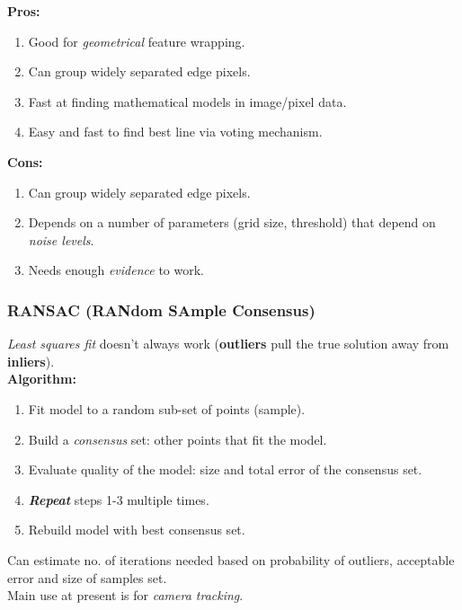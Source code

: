 \documentclass[english, 10pt]{article}
\begin{document}
  \textbf{Pros:}

  \begin{enumerate}
  \item
    Good for \emph{geometrical} feature wrapping.
  \item
    Can group widely separated edge pixels.
  \item
    Fast at finding mathematical models in image/pixel data.
  \item
    Easy and fast to find best line via voting mechanism.
  \end{enumerate}


  \textbf{Cons:}

  \begin{enumerate}
  \item
    Can group widely separated edge pixels.
  \item
    Depends on a number of parameters (grid size, threshold) that depend
    on \emph{noise levels}.
  \item
    Needs enough \emph{evidence} to work.
  \end{enumerate}

\subsubsection{RANSAC (RANdom SAmple
Consensus)}

  \textit{Least squares fit} doesn't always work (\textbf{outliers} pull the
  true solution away from \textbf{inliers}). \\
  
  \textbf{Algorithm:}

  \begin{enumerate}
  \item
    Fit model to a random sub-set of points (sample).
  \item
    Build a \emph{consensus} set: other points that fit the model.
  \item
    Evaluate quality of the model: size and total error of the consensus
    set.
  \item
    \textbf{\emph{Repeat}} steps 1-3 multiple times.
  \item
    Rebuild model with best consensus set.
  \end{enumerate}
  

  Can estimate no. of iterations needed based on probability of
  outliers, acceptable error and size of samples set. \\

  Main use at present is for \emph{camera tracking}. \\
\end{document}
